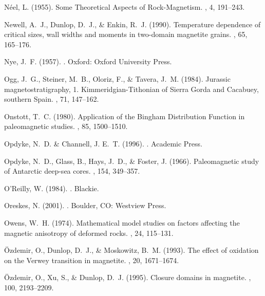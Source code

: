 N\'eel, L. (1955).
\newblock Some Theoretical Aspects of Rock-Magnetism.
, 4, 191--243.

Newell, A.~J., Dunlop, D.~J., \& Enkin, R.~J. (1990).
\newblock Temperature dependence of critical sizes, wall widths and moments in
  two-domain magnetite grains.
, 65, 165--176.

Nye, J.~F. (1957).
.
\newblock Oxford: Oxford University Press.

Ogg, J.~G., Steiner, M.~B., Oloriz, F., \& Tavera, J.~M. (1984).
\newblock Jurassic magnetostratigraphy, 1. Kimmeridgian-Tithonian of Sierra
  Gorda and Cacabuey, southern Spain.
, 71, 147--162.

Onstott, T.~C. (1980).
\newblock Application of the Bingham Distribution Function in paleomagnetic
  studies.
, 85, 1500--1510.

Opdyke, N.~D. \& Channell, J. E.~T. (1996).
.
\newblock Academic Press.

Opdyke, N.~D., Glass, B., Hays, J.~D., \& Foster, J. (1966).
\newblock Paleomagnetic study of Antarctic deep-sea cores.
, 154, 349--357.

O'Reilly, W. (1984).
.
\newblock Blackie.

Oreskes, N. (2001).
.
\newblock Boulder, CO: Westview Press.

Owens, W.~H. (1974).
\newblock Mathematical model studies on factors affecting the magnetic
  anisotropy of deformed rocks.
, 24, 115--131.

\"Ozdemir, O., Dunlop, D.~J., \& Moskowitz, B.~M. (1993).
\newblock The effect of oxidation on the Verwey transition in magnetite.
, 20, 1671--1674.

\"Ozdemir, O., Xu, S., \& Dunlop, D.~J. (1995).
\newblock Closure domains in magnetite.
, 100, 2193--2209.

